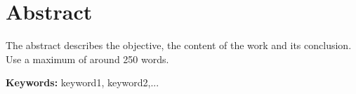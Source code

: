 \chapter*{Abstract}


The abstract describes the objective, the content of the work and its conclusion. Use a maximum of around 250 words.

\vspace{1cm}

\textbf{\Large Keywords:} keyword1, keyword2,...

\cleardoublepage
